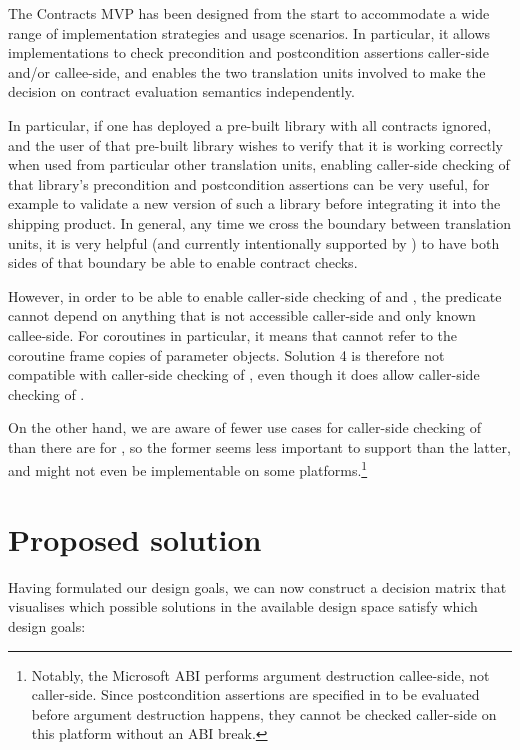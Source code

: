 The Contracts MVP has been designed from the start to accommodate a wide range of implementation strategies and usage scenarios. In particular, it allows implementations to check precondition and postcondition assertions caller-side and/or callee-side, and enables the two translation units involved to make the decision on contract evaluation semantics independently.

In particular, if one has deployed a pre-built library with all contracts ignored, and the user of that pre-built library wishes to verify that it is working correctly when used from particular other translation units, enabling caller-side checking of that library's precondition and postcondition assertions can be very useful, for example to validate a new version of such a library before integrating it into the shipping product. In general, any time we cross the boundary between translation units, it is very helpful (and currently intentionally supported by \cite{P2900R8}) to have both sides of that boundary be able to enable contract checks.

However, in order to be able to enable caller-side checking of  and , the predicate cannot depend on anything that is not accessible caller-side and only known callee-side. For coroutines in particular, it means that  cannot refer to the coroutine frame copies of parameter objects. Solution 4 is therefore not compatible with caller-side checking of , even though it does allow caller-side checking of .

On the other hand, we are aware of fewer use cases for caller-side checking of  than there are for , so the former seems less important to support than the latter, and might not even be implementable on some platforms.\footnote{Notably, the Microsoft ABI performs argument destruction callee-side, not caller-side. Since postcondition assertions are specified in \cite{P2900R8} to be evaluated before argument destruction happens, they cannot be checked caller-side on this platform without an ABI break.}

\section{Proposed solution}

Having formulated our design goals, we can now construct a decision matrix that visualises which possible solutions in the available design space satisfy which design goals:


